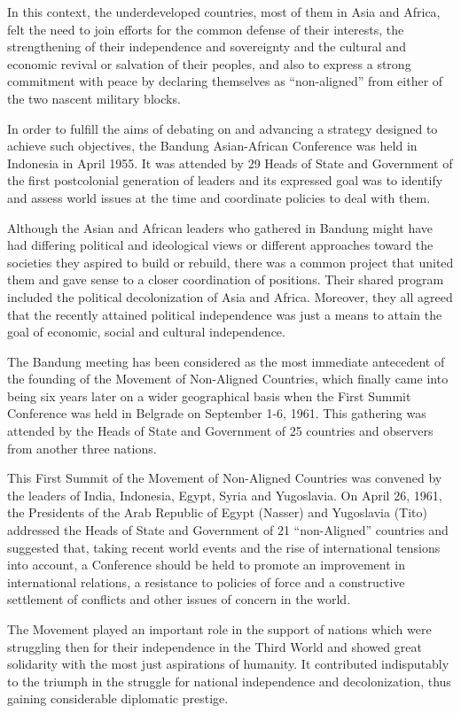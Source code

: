 \documentclass[
  openany]{book}
\begin{document}
In this context, the underdeveloped countries, most of them in Asia and Africa, felt the need to join efforts for the common defense of their interests, the strengthening of their independence and sovereignty and the cultural and economic revival or salvation of their peoples, and also to express a strong commitment with peace by declaring themselves as ``non-aligned'' from either of the two nascent military blocks.

In order to fulfill the aims of debating on and advancing a strategy designed to achieve such objectives, the Bandung Asian-African Conference was held in Indonesia in April 1955. It was attended by 29 Heads of State and Government of the first postcolonial generation of leaders and its expressed goal was to identify and assess world issues at the time and coordinate policies to deal with them.

Although the Asian and African leaders who gathered in Bandung might have had differing political and ideological views or different approaches toward the societies they aspired to build or rebuild, there was a common project that united them and gave sense to a closer coordination of positions. Their shared program included the political decolonization of Asia and Africa. Moreover, they all agreed that the recently attained political independence was just a means to attain the goal of economic, social and cultural independence.

The Bandung meeting has been considered as the most immediate antecedent of the founding of the Movement of Non-Aligned Countries, which finally came into being six years later on a wider geographical basis when the First Summit Conference was held in Belgrade on September 1-6, 1961. This gathering was attended by the Heads of State and Government of 25 countries and observers from another three nations.

This First Summit of the Movement of Non-Aligned Countries was convened by the leaders of India, Indonesia, Egypt, Syria and Yugoslavia. On April 26, 1961, the Presidents of the Arab Republic of Egypt (Nasser) and Yugoslavia (Tito) addressed the Heads of State and Government of 21 ``non-Aligned'' countries and suggested that, taking recent world events and the rise of international tensions into account, a Conference should be held to promote an improvement in international relations, a resistance to policies of force and a constructive settlement of conflicts and other issues of concern in the world.

The Movement played an important role in the support of nations which were struggling then for their independence in the Third World and showed great solidarity with the most just aspirations of humanity. It contributed indisputably to the triumph in the struggle for national independence and decolonization, thus gaining considerable diplomatic prestige.
\end{document}
